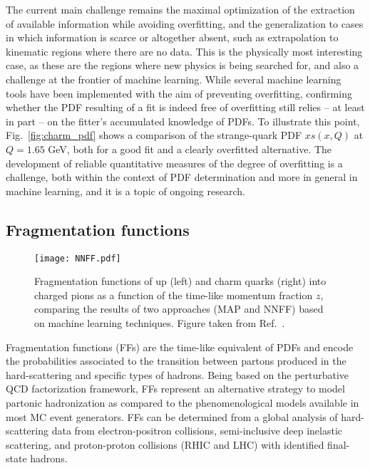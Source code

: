 \documentclass[submission,Phys]{SciPost}
\begin{document}
The current main challenge remains the maximal optimization of the extraction of available information while avoiding overfitting, and the generalization to cases in which information is scarce or altogether absent, such as extrapolation to kinematic regions where there are no data. This is the physically most interesting case, as these are the regions where new physics is being searched for, and also a challenge at the frontier of machine learning. While several machine learning tools have been implemented with the aim of preventing overfitting, confirming whether the PDF resulting of a fit is indeed free of overfitting still relies -- at least in part -- on the fitter's accumulated knowledge of PDFs. To illustrate this point, Fig.~\ref{fig:charm_pdf} shows a comparison of the strange-quark PDF $xs(x,Q)$ at $Q=1.65$ GeV, both for a good fit and a clearly overfitted alternative. The development of reliable  quantitative measures of the degree of overfitting is a challenge, both within the context of PDF determination and more in general in machine learning, and it is a  topic of ongoing research.

\subsection{Fragmentation functions}
\label{sec:generators_frag}

\begin{figure}[t]
\centering
  \texttt{[image: NNFF.pdf]}
  \caption{Fragmentation functions of up (left) and charm quarks (right) into charged pions as a function of the time-like momentum fraction $z$, comparing the results of two approaches (MAP and NNFF) based on machine learning techniques. Figure taken from Ref.~\cite{Khalek:2021gxf}.}
  \label{fig:NNFF}
\end{figure}

Fragmentation functions (FFs) are the time-like equivalent of PDFs and encode the probabilities associated to the transition between partons produced in the hard-scattering  and specific types of hadrons. Being based on the perturbative QCD factorization framework, FFs represent an alternative strategy to model partonic hadronization as compared to the  phenomenological models available in most MC event generators. FFs can be determined from a global analysis of hard-scattering data from electron-positron collisions, semi-inclusive deep inelastic scattering, and proton-proton collisions (RHIC and LHC) with identified final-state hadrons.
\end{document}
